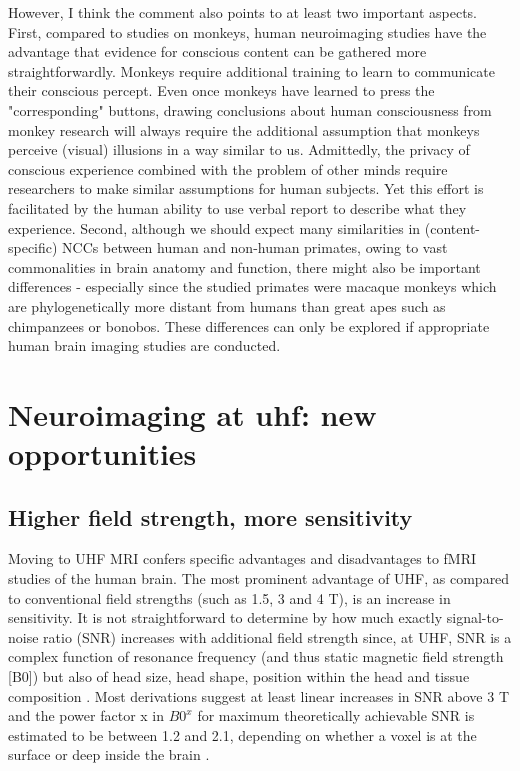 However, I think the comment also points to at least two important aspects. First, compared to studies on monkeys, human neuroimaging studies have the advantage that evidence for conscious content can be gathered more straightforwardly. Monkeys require additional training to learn to communicate their conscious percept. Even once monkeys have learned to press the "corresponding" buttons, drawing conclusions about human consciousness from monkey research will always require the additional assumption that monkeys perceive (visual) illusions in a way similar to us. Admittedly, the privacy of conscious experience combined with the problem of other minds require researchers to make similar assumptions for human subjects. Yet this effort is facilitated by the human ability to use verbal report to describe what they experience. Second, although we should expect many similarities in (content-specific) NCCs between human and non-human primates, owing to vast commonalities in brain anatomy and function, there might also be important differences - especially since the studied primates were macaque monkeys which are phylogenetically more distant from humans than great apes such as chimpanzees or bonobos. These differences can only be explored if appropriate human brain imaging studies are conducted.

\section{Neuroimaging at uhf: new opportunities}
\subsection{Higher field strength, more sensitivity}
Moving to UHF MRI confers specific advantages and disadvantages to fMRI studies of the human brain. The most prominent advantage of UHF, as compared to conventional field strengths (such as 1.5, 3 and 4 T), is an increase in sensitivity. It is not straightforward to determine by how much exactly signal-to-noise ratio (SNR) increases with additional field strength since, at UHF, SNR is a complex function of resonance frequency (and thus static magnetic field strength [B0]) but also of head size, head shape, position within the head and tissue composition \parencite{Ugurbil2003}. Most derivations suggest at least linear increases in SNR above 3 T \parencite{Ladd2018} and the power factor x in $B0^x$ for maximum theoretically achievable SNR is estimated to be between 1.2 and 2.1, depending on whether a voxel is at the surface or deep inside the brain \parencite{Ladd2018}.

